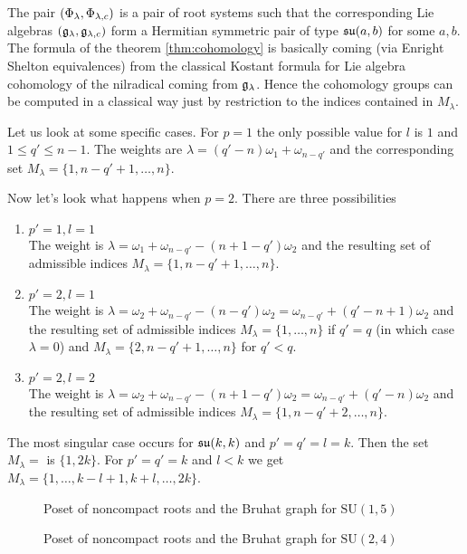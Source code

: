 The pair $(\Phi_\lambda,\Phi_{\lambda,c})$ is a pair of root systems such that the corresponding Lie algebras $(\mathfrak{g}_\lambda,\mathfrak{g}_{\lambda,c})$ form a Hermitian symmetric pair of type $\mathfrak{su}(a,b)$ for some $a,b$. The formula of the theorem \ref{thm:cohomology} is basically coming (via Enright Shelton equivalences) from the classical Kostant formula for Lie algebra cohomology of the nilradical coming from $\mathfrak{g}_\lambda$. Hence the cohomology groups can be computed in a classical way just by restriction to the indices contained in $M_\lambda$.

Let us look at some specific cases. For $p=1$ the only possible value for $l$ is $1$ and $1\leq q' \leq n-1$. The weights are $\lambda = (q'-n)\omega_1 + \omega_{n-q'}$ and the corresponding set $M_\lambda = \{ 1,n-q'+1,\ldots,n \}$.


Now let's look what happens when $p=2$. There are three possibilities
\begin{enumerate}
 \item $p'=1, l=1$\\
 The weight is $\lambda=\omega_1+\omega_{n-q'}-(n+1-q')\omega_2$ and the resulting set of admissible indices $M_\lambda = \{1,n-q'+1,\ldots,n\}$.
 \item $p'=2, l=1$\\
 The weight is $\lambda=\omega_2+\omega_{n-q'}-(n-q')\omega_2 = \omega_{n-q'} + (q'-n+1)\omega_2$ and the resulting set of admissible indices $M_\lambda = \{1,\ldots,n\}$ if $q'=q$ (in which case $\lambda = 0$) and $M_\lambda = \{2,n-q'+1,\ldots,n\}$ for $q'<q$.
 \item $p'=2, l=2$\\
 The weight is $\lambda=\omega_2+\omega_{n-q'}-(n+1-q')\omega_2 = \omega_{n-q'}+(q'-n)\omega_2$ and the resulting set of admissible indices $M_\lambda = \{1,n-q'+2,\ldots,n\}$.
\end{enumerate}

The most singular case occurs for $\mathfrak{su}(k,k)$ and $p'=q'=l = k $. Then the set $M_\lambda =$ is $\{1,2k\}$. For $p'=q'=k$ and $l<k$ we get $M_\lambda = \{ 1,\ldots,k-l+1,k+l,\ldots, 2k \}$.

\begin{figure}[H]
  \centering 
   
	 
  \caption{Poset of noncompact roots and the Bruhat graph for $\mathrm{SU}(1,5)$}
\end{figure} 

\begin{figure}[H]
  \centering 
   
	 
  \caption{Poset of noncompact roots and the Bruhat graph for $\mathrm{SU}(2,4)$}
\end{figure} 

